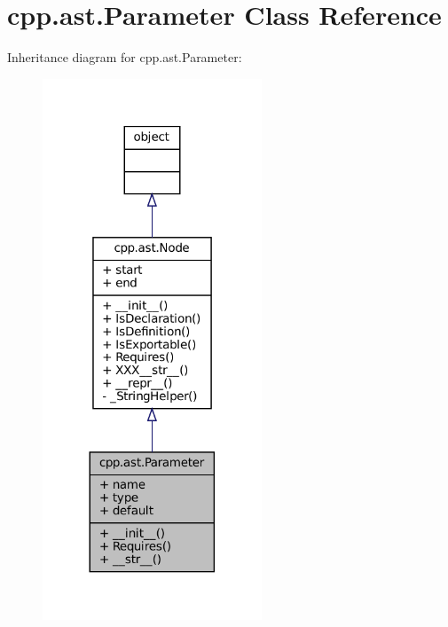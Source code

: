 \hypertarget{classcpp_1_1ast_1_1Parameter}{}\section{cpp.\+ast.\+Parameter Class Reference}
\label{classcpp_1_1ast_1_1Parameter}


Inheritance diagram for cpp.\+ast.\+Parameter\+:
\nopagebreak
\begin{figure}[H]
\begin{center}
\leavevmode
\includegraphics[width=185pt]{classcpp_1_1ast_1_1Parameter__inherit__graph}
\end{center}
\end{figure}


